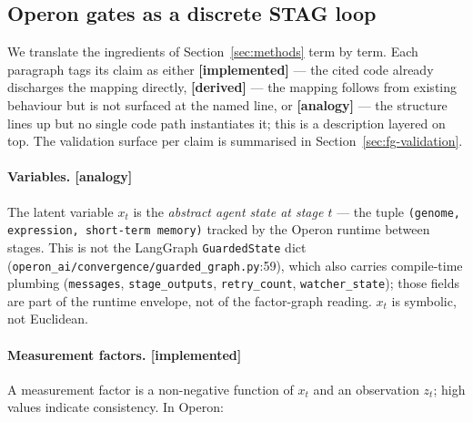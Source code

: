 \subsection{Operon gates as a discrete STAG loop}\label{sec:fg-mapping}

We translate the ingredients of Section~\ref{sec:methods} term by
term.  Each paragraph tags its claim as either
\textbf{[implemented]} --- the cited code already discharges the
mapping directly, \textbf{[derived]} --- the mapping follows from
existing behaviour but is not surfaced at the named line, or
\textbf{[analogy]} --- the structure lines up but no single code
path instantiates it; this is a description layered on top.  The
validation surface per claim is summarised in
Section~\ref{sec:fg-validation}.

\paragraph{Variables. [analogy]}
The latent variable $x_t$ is the \emph{abstract agent state at
stage $t$} --- the tuple \texttt{(genome, expression, short-term
memory)} tracked by the Operon runtime between stages.  This is
not the LangGraph \texttt{GuardedState} dict
(\texttt{operon\_ai/convergence/guarded\_graph.py}:59), which also
carries compile-time plumbing (\texttt{messages},
\texttt{stage\_outputs}, \texttt{retry\_count},
\texttt{watcher\_state}); those fields are part of the runtime
envelope, not of the factor-graph reading.  $x_t$ is symbolic, not
Euclidean.

\paragraph{Measurement factors. [implemented]}
A measurement factor is a non-negative function of $x_t$ and an
observation $z_t$; high values indicate consistency.  In Operon:

